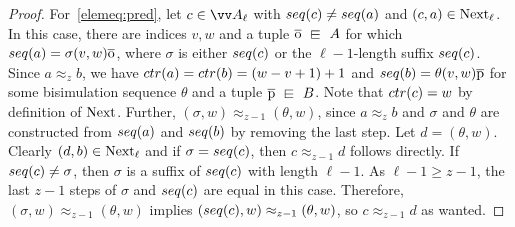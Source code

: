 \begin{proof}
  For~\ref{elemeq:pred}, let $c \in \unraveldom{A}_{\ell}$ with $\seq{c} \neq \seq{a}$ and $(c,a) \in \mathrm{Next}_{\ell}$.
  In this case, there are indices $v,w$ and a tuple $\elemtupleo \sqin A$ for which $\seq{a} = \sigma (v,w) \elemtupleo$, where $\sigma$ is either $\seq{c}$ or the $\ell-1$-length suffix $\seq{c}$.
  Since $a \approx_{z} b$, we have $\ctr{a} = \ctr{b} = (w-v+1) + 1$ and $\seq{b} = \theta (v,w) \elemtuplep$ for some bisimulation sequence $\theta$ and a tuple $\elemtuplep \sqin B$.
  Note that $\ctr{c} = w$ by definition of $\mathrm{Next}$.
  Further, $(\sigma, w) \approx_{z-1} (\theta, w)$, since $a \approx_{z} b$ and $\sigma$ and $\theta$ are constructed from $\seq{a}$ and $\seq{b}$ by removing the last step.
  Let $d = (\theta, w)$.
  Clearly $(d,b) \in \mathrm{Next}_{\ell}$ and if $\sigma = \seq{c}$, then $c \approx_{z-1} d$ follows directly.
  If $\seq{c} \neq \sigma$, then $\sigma$ is a suffix of $\seq{c}$ with length $\ell-1$.
  As $\ell-1 \ge z-1$, the last $z-1$ steps of $\sigma$ and $\seq{c}$ are equal in this case.
  Therefore, $(\sigma, w) \approx_{z-1} (\theta, w)$ implies $(\seq{c}, w) \approx_{z-1} (\theta, w)$, so $c \approx_{z-1} d$ as wanted.
\end{proof}


